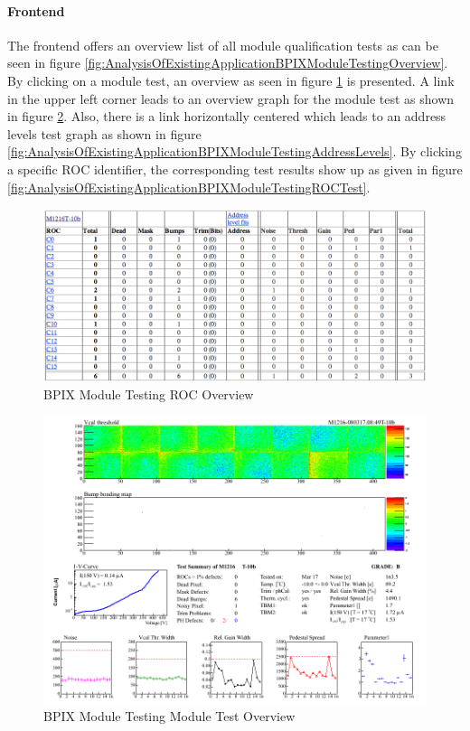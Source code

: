 \documentclass[0_Bericht]{subfiles}
\begin{document}
				\paragraph{Frontend}
					The frontend offers an overview list of all module qualification tests as can be seen in figure \ref{fig:AnalysisOfExistingApplicationBPIXModuleTestingOverview}. 
					By clicking on a module test, an overview as seen in figure \ref{fig:AnalysisOfExistingApplicationBPIXModuleTestingROCOverview} is presented. 
					A link in the upper left corner leads to an overview graph for the module test as shown in figure \ref{fig:AnalysisOfExistingApplicationBPIXModuleTestingModuleOverview}.
					Also, there is a link horizontally centered which leads to an address levels test graph as shown in figure \ref{fig:AnalysisOfExistingApplicationBPIXModuleTestingAddressLevels}.
					By clicking a specific ROC identifier, the corresponding test results show up as given in figure \ref{fig:AnalysisOfExistingApplicationBPIXModuleTestingROCTest}.
					\begin{figure}[h!]
						\centering
						\includegraphics[width=160mm]{Content/Graphics/4_2_BPIXModuleTestingROCOverview.png}
						\caption{BPIX Module Testing ROC Overview}
						\label{fig:AnalysisOfExistingApplicationBPIXModuleTestingROCOverview}
					\end{figure}
					\begin{figure}[h!]
						\centering
						\includegraphics[width=160mm]{Content/Graphics/4_5_ModuleOverview.png}
						\caption{BPIX Module Testing Module Test Overview}
						\label{fig:AnalysisOfExistingApplicationBPIXModuleTestingModuleOverview}
					\end{figure}
\end{document}
